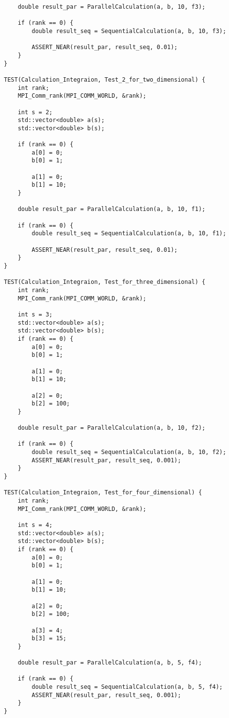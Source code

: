 \documentclass{report}
\begin{document}
\begin{lstlisting}
    double result_par = ParallelCalculation(a, b, 10, f3);

    if (rank == 0) {
        double result_seq = SequentialCalculation(a, b, 10, f3);

        ASSERT_NEAR(result_par, result_seq, 0.01);
    }
}

TEST(Calculation_Integraion, Test_2_for_two_dimensional) {
    int rank;
    MPI_Comm_rank(MPI_COMM_WORLD, &rank);

    int s = 2;
    std::vector<double> a(s);
    std::vector<double> b(s);

    if (rank == 0) {
        a[0] = 0;
        b[0] = 1;

        a[1] = 0;
        b[1] = 10;
    }

    double result_par = ParallelCalculation(a, b, 10, f1);

    if (rank == 0) {
        double result_seq = SequentialCalculation(a, b, 10, f1);

        ASSERT_NEAR(result_par, result_seq, 0.01);
    }
}

TEST(Calculation_Integraion, Test_for_three_dimensional) {
    int rank;
    MPI_Comm_rank(MPI_COMM_WORLD, &rank);

    int s = 3;
    std::vector<double> a(s);
    std::vector<double> b(s);
    if (rank == 0) {
        a[0] = 0;
        b[0] = 1;

        a[1] = 0;
        b[1] = 10;

        a[2] = 0;
        b[2] = 100;
    }

    double result_par = ParallelCalculation(a, b, 10, f2);

    if (rank == 0) {
        double result_seq = SequentialCalculation(a, b, 10, f2);
        ASSERT_NEAR(result_par, result_seq, 0.001);
    }
}

TEST(Calculation_Integraion, Test_for_four_dimensional) {
    int rank;
    MPI_Comm_rank(MPI_COMM_WORLD, &rank);

    int s = 4;
    std::vector<double> a(s);
    std::vector<double> b(s);
    if (rank == 0) {
        a[0] = 0;
        b[0] = 1;

        a[1] = 0;
        b[1] = 10;

        a[2] = 0;
        b[2] = 100;

        a[3] = 4;
        b[3] = 15;
    }

    double result_par = ParallelCalculation(a, b, 5, f4);

    if (rank == 0) {
        double result_seq = SequentialCalculation(a, b, 5, f4);
        ASSERT_NEAR(result_par, result_seq, 0.001);
    }
}


\end{lstlisting}
\end{document}

